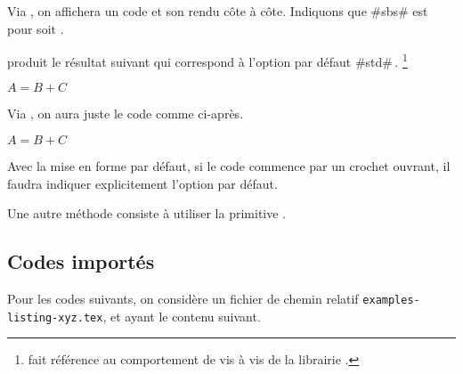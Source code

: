 \begin{tdocexa}
    Via , on affichera un code et son rendu côte à côte.
    Indiquons que \tdocinlatex#sbs# est pour  soit .

\end{tdocexa}


\begin{tdocexa}[À la suite]
     produit le résultat suivant qui correspond à l'option par défaut \tdocinlatex#std#\,.
    \footnote{
         fait référence au comportement  de  vis à vis de la librairie .
    }

    \begin{tdoclatex}
        $A = B + C$
    \end{tdoclatex}
\end{tdocexa}


\begin{tdocexa}
    Via , on aura juste le code comme ci-après.

    \begin{tdoclatex}[code]
        $A = B + C$
    \end{tdoclatex}
\end{tdocexa}


\begin{tdocwarn}
    Avec la mise en forme par défaut, si le code commence par un crochet ouvrant, il faudra indiquer explicitement l'option par défaut.


    \smallskip

    Une autre méthode consiste à utiliser la primitive .

\end{tdocwarn}


\subsection{Codes importés}

Pour les codes suivants, on considère un fichier de chemin relatif \verb+examples-listing-xyz.tex+, et ayant le contenu suivant.





